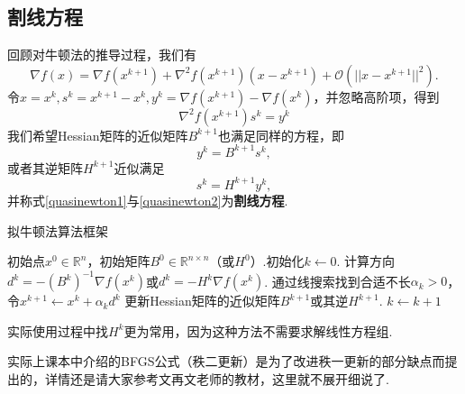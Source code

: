 \subsection{割线方程}
回顾对牛顿法的推导过程，我们有
\begin{equation*}
	\nabla f(x) = \nabla f(x^{k+1}) +\nabla^2 f(x^{k+1})(x-x^{k+1}) + \mathcal{O}(||x-x^{k+1}||^2).
\end{equation*}
令$x=x^k, s^k = x^{k+1}-x^k, y^k = \nabla f(x^{k+1}) - \nabla f(x^k)$，并忽略高阶项，得到
\begin{equation*}
	\nabla^2f(x^{k+1})s^k = y^k
\end{equation*}
我们希望Hessian矩阵的近似矩阵$B^{k+1}$也满足同样的方程，即
\begin{equation}\label{quasinewton1}
	y^k = B^{k+1}s^k,
\end{equation}
或者其逆矩阵$H^{k+1}$近似满足
\begin{equation}\label{quasinewton2}
	s^k = H^{k+1}y^k,
\end{equation}
并称式\eqref{quasinewton1}与\eqref{quasinewton2}为\textbf{割线方程}.
\begin{algorithm}[H]
\caption{拟牛顿法算法框架}%
\begin{algorithmic}[1]%
\Require 初始点$x^0\in\mathbb{R}^n$，初始矩阵$B^0\in\mathbb{R}^{n\times n}$（或$H^0$）.\State 初始化$k \leftarrow 0$.
\State 计算方向$d^k = -(B^k)^{-1}\nabla f(x^k)$或$d^k = -H^k\nabla f(x^k)$.
\State 通过线搜索找到合适不长$\alpha_k>0$，令$x^{k+1} \leftarrow x^k+\alpha_k d^k$
\State 更新Hessian矩阵的近似矩阵$B^{k+1}$或其逆$H^{k+1}$.
\State $k\leftarrow k+1$
\EndWhile
\end{algorithmic}  
\end{algorithm}
实际使用过程中找$H^k$更为常用，因为这种方法不需要求解线性方程组.\par
实际上课本中介绍的BFGS公式（秩二更新）是为了改进秩一更新的部分缺点而提出的，详情还是请大家参考文再文老师的教材，这里就不展开细说了.
